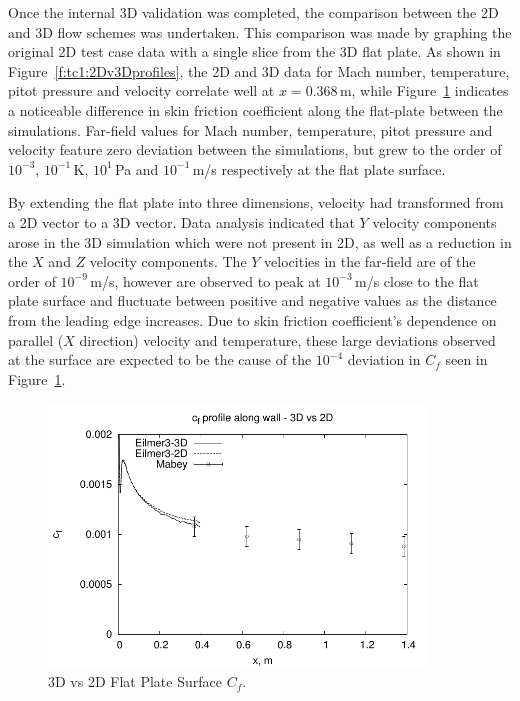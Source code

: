 %
Once the internal 3D validation was completed, the comparison between the 2D and 3D
flow schemes was undertaken. This comparison was made by graphing the original 2D test case data with a single slice from the 3D flat plate. As shown in Figure~\ref{f:tc1:2Dv3Dprofiles}, the 2D and 3D data for Mach number, temperature, pitot pressure and velocity correlate well at $x=0.368$\,m, while Figure~\ref{f:tc1:2Dv3Dcf} indicates a noticeable difference in skin friction coefficient along the flat-plate between the simulations.
Far-field values for Mach number, temperature, pitot pressure and velocity feature zero deviation between the simulations, but grew to the order of $10^{-3}$, $10^{-1}$\,K, $10^1$\,Pa and $10^{-1}$\,m/s respectively at the flat plate surface. 

By extending the flat plate into three dimensions, velocity had transformed from a 2D vector to a 3D vector. Data analysis indicated that $Y$ velocity components arose in the 3D simulation which were not present in 2D, as well as a reduction in the $X$ and $Z$ velocity components.  The $Y$ velocities in the far-field are of the order of $10^{-9}$\,m/s, however are observed to peak at $10^{-3}$\,m/s close to the flat plate surface and fluctuate between positive and negative values as the distance from the leading edge increases. Due to skin friction coefficient's dependence on parallel ($X$ direction) velocity and temperature, these large deviations observed at the surface are expected to be the cause of the $10^{-4}$ deviation in $C_f$ seen in Figure~\ref{f:tc1:2Dv3Dcf}.
%
\begin{figure}[htbp]
 \begin{center}
  \includegraphics[width=10cm]{./chap6-3Dflatplate/figs/2Dto3D/mabey-cf1.pdf}
  \caption{3D vs 2D Flat Plate Surface $C_f$.}
  \label{f:tc1:2Dv3Dcf}
 \end{center}
\end{figure}
%

